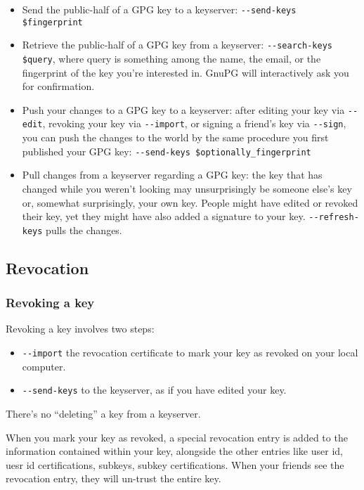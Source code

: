 \begin{itemize}
        \item Send the public-half of a GPG key to a keyserver:
            \verb+--send-keys $fingerprint+
        \item Retrieve the public-half of a GPG key from a keyserver:
            \verb+--search-keys $query+, where query is something among the name, the email, or the fingerprint of the key you’re interested in. GnuPG will interactively ask you for confirmation. 
        \item Push your changes to a GPG key to a keyserver: after editing your
            key via \verb+--edit+, revoking your key via \verb+--import+, or
            signing a friend’s key via \verb+--sign+, you can push the changes
            to the world by the same procedure you first published your GPG
            key: \verb+--send-keys $optionally_fingerprint+
        \item Pull changes from a keyserver regarding a GPG key: the key that
            has changed while you weren’t looking may unsurprisingly be someone
            else’s key or, somewhat surprisingly, your own key. People might
            have edited or revoked their key, yet they might have also added a
            signature to your key. \verb+--refresh-keys+ pulls the changes.
\end{itemize}

\subsection{Revocation}
\subsubsection{Revoking a key}
Revoking a key involves two steps:
\begin{itemize}
    \item \verb+--import+ the revocation certificate to mark your key as
        revoked on your local computer.
    \item \verb+--send-keys+ to the keyserver, as if you have edited your key.
\end{itemize}

There’s no “deleting” a key from a keyserver. 

When you mark your key as revoked, a special revocation entry is added to the
information contained within your key, alongside the other entries like user
id, uesr id certifications, subkeys, subkey certifications. When your friends
see the revocation entry, they will un-trust the entire key.

